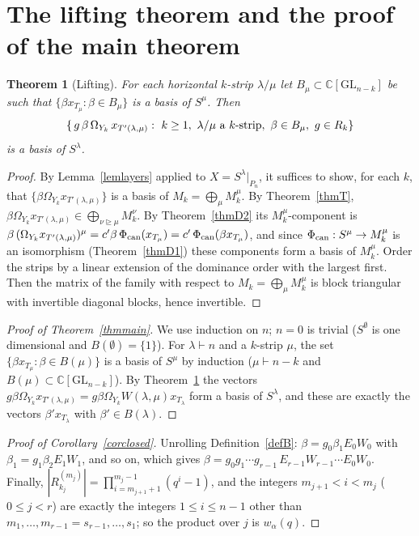 \documentclass[11pt, letterpaper]{amsart}
\let\amstext\text
\renewcommand{\text}[1]{\amstext{\upshape #1}}%
\newtheorem{theorem}{Theorem}
\theoremstyle{definition}
\theoremstyle{remark}
\newcommand{\CC}{\mathbb{C}}
\newcommand{\GL}{\mathrm{GL}}
\begin{document}
\section{The lifting theorem and the proof of the main theorem}\label{secproof}

\begin{theorem}[Lifting]\label{thmlift}
For each horizontal $k$-strip $\lambda/\mu$ let $B_\mu\subset\CC[\GL_{n-k}]$ be such that $\{\beta x_{T_\mu}:\beta\in B_\mu\}$ is a basis of $S^\mu$. Then
\[
\{\,g\,\beta\,\Omega_{Y_k}\,x_{T'(\lambda,\mu)}:\ k\ge1,\ \lambda/\mu\ \text{a $k$-strip},\ \beta\in B_\mu,\ g\in R_k\}
\]
is a basis of $S^\lambda$.
\end{theorem}
\begin{proof}
By Lemma~\ref{lemlayers} applied to $X=S^\lambda|_{P_n}$, it suffices to show, for each $k$, that $\{\beta \Omega_{Y_k}x_{T'(\lambda,\mu)}\}$ is a basis of $M_k=\bigoplus_\mu M_k^\mu$. By Theorem~\ref{thmT}, $\beta \Omega_{Y_k}x_{T'(\lambda,\mu)}\in\bigoplus_{\nu\trianglerighteq\mu}M_k^{\nu}$. By Theorem~\ref{thmD2} its $M_k^\mu$-component is $\beta\,(\Omega_{Y_k}x_{T'(\lambda,\mu)})^\mu=c'\beta\,\Phi_{\rm can}(x_{T_\mu})=c'\,\Phi_{\rm can}(\beta x_{T_\mu})$, and since $\Phi_{\rm can}:S^\mu\to M_k^\mu$ is an isomorphism (Theorem~\ref{thmD1}) these components form a basis of $M_k^\mu$. Order the strips by a linear extension of the dominance order with the largest first. Then the matrix of the family with respect to $M_k=\bigoplus_\mu M_k^\mu$ is block triangular with invertible diagonal blocks, hence invertible.
\end{proof}

\begin{proof}[Proof of Theorem~\ref{thmmain}]
We use induction on $n$; $n=0$ is trivial ($S^\emptyset$ is one dimensional and $B(\emptyset)=\{1\}$). For $\lambda\vdash n$ and a $k$-strip $\mu$, the set $\{\beta x_{T_\mu}:\beta\in B(\mu)\}$ is a basis of $S^\mu$ by induction ($\mu\vdash n-k$ and $B(\mu)\subset\CC[\GL_{n-k}]$). By Theorem~\ref{thmlift} the vectors $g\beta \Omega_{Y_k}x_{T'(\lambda,\mu)}=g\beta \Omega_{Y_k}W(\lambda,\mu)x_{T_\lambda}$ form a basis of $S^\lambda$, and these are exactly the vectors $\beta'x_{T_\lambda}$ with $\beta'\in B(\lambda)$.
\end{proof}

\begin{proof}[Proof of Corollary~\ref{corclosed}]
Unrolling Definition~\ref{defB}: $\beta=g_0\beta_1E_0W_0$ with $\beta_1=g_1\beta_2E_1W_1$, and so on, which gives $\beta=g_0g_1\cdots g_{r-1}\,E_{r-1}W_{r-1}\cdots E_0W_0$. Finally, $|R^{(m_j)}_{k_j}|=\prod_{i=m_{j+1}+1}^{m_j-1}(q^i-1)$, and the integers $m_{j+1}<i<m_j$ ($0\le j<r$) are exactly the integers $1\le i\le n-1$ other than $m_1,\dots,m_{r-1}=s_{r-1},\dots,s_1$; so the product over $j$ is $w_\alpha(q)$.
\end{proof}
\end{document}
